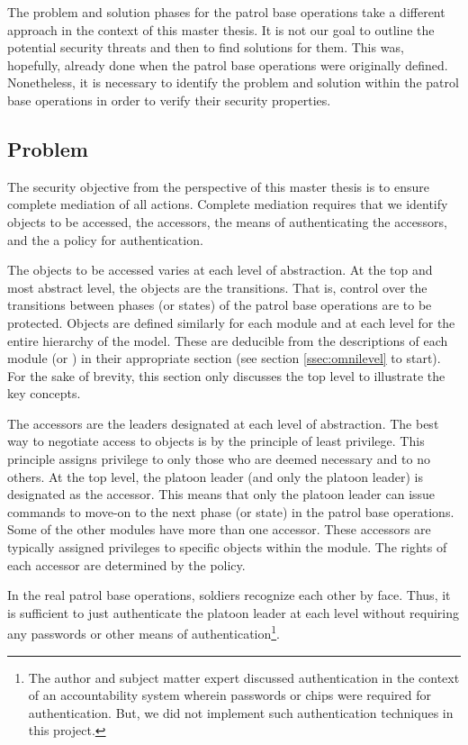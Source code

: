 \documentclass[../../main/main.tex]{subfiles}
\begin{document}
The problem and solution phases for the patrol base operations take a different approach in the context of this master thesis. It is not our goal to outline the potential security threats and then to find solutions for them.  This was, hopefully, already done when the patrol base operations were originally defined.  Nonetheless, it is necessary to identify the problem and solution within the patrol base operations in order to verify their security properties.  


\subsection{Problem}
The security objective from the perspective of this master thesis is to ensure complete mediation of all actions.  Complete mediation requires that we identify objects to be accessed, the accessors, the means of authenticating the accessors, and the a policy for authentication.  

The objects to be accessed varies at each level of abstraction. At the top and most abstract level, the objects are the transitions.  That is, control over the transitions between phases (or states) of the patrol base operations are to be protected.  Objects are defined similarly for each module and at each level for the entire hierarchy of the model.  These are deducible from the descriptions of each module (or ) in their appropriate section (see section \ref{ssec:omnilevel} to start).  For the sake of brevity, this section only discusses the top level to illustrate the key concepts.  

The accessors are the leaders designated at each level of abstraction.  The best way to negotiate access to objects is by the principle of least privilege.  This principle assigns privilege to only those who are deemed necessary and to no others.  At the top level, the platoon leader (and only the platoon leader) is designated as the accessor. This means that only the platoon leader can issue commands to move-on to the next phase (or state) in the patrol base operations. Some of the other modules have more than one accessor.  These accessors are typically assigned privileges to specific objects within the module.  The rights of each accessor are determined by the policy.

In the real patrol base operations, soldiers recognize each other by face.  Thus, it is sufficient to just authenticate the platoon leader at each level without requiring any passwords or other means of authentication\footnote{The author and subject matter expert discussed authentication in the context of an accountability system wherein passwords or chips were required for authentication.  But, we did not implement such authentication techniques in this project.}.
\end{document}
